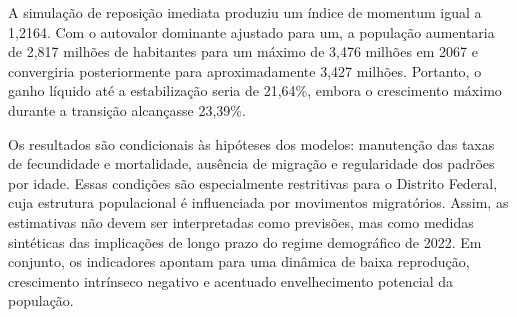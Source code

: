 \documentclass[a4paper,12pt]{article}
\begin{document}
A simulação de reposição imediata produziu um índice de momentum igual a 1,2164. Com o autovalor dominante ajustado para um, a população aumentaria de 2,817 milhões de habitantes para um máximo de 3,476 milhões em 2067 e convergiria posteriormente para aproximadamente 3,427 milhões. Portanto, o ganho líquido até a estabilização seria de 21,64\%, embora o crescimento máximo durante a transição alcançasse 23,39\%.

Os resultados são condicionais às hipóteses dos modelos: manutenção das taxas de fecundidade e mortalidade, ausência de migração e regularidade dos padrões por idade. Essas condições são especialmente restritivas para o Distrito Federal, cuja estrutura populacional é influenciada por movimentos migratórios. Assim, as estimativas não devem ser interpretadas como previsões, mas como medidas sintéticas das implicações de longo prazo do regime demográfico de 2022. Em conjunto, os indicadores apontam para uma dinâmica de baixa reprodução, crescimento intrínseco negativo e acentuado envelhecimento potencial da população.

\renewcommand{\refname}{\centering REFERÊNCIAS}

{\singlespacing
\clearpage

}
\end{document}
